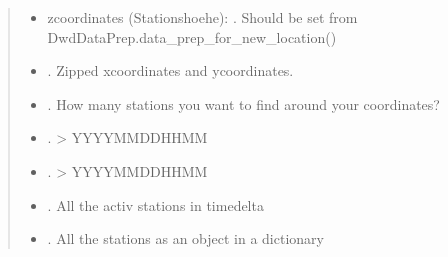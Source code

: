 \documentclass[letterpaper,10pt,english]{sphinxmanual}
\begin{document}
\begin{fulllineitems}
\begin{fulllineitems}
\begin{quote}
\begin{description}
\begin{itemize}
\item {} 
\sphinxAtStartPar
{} \textendash{} z\sphinxhyphen{}coordinates (Stationshoehe): . Should be set from DwdDataPrep.data\_prep\_for\_new\_location()

\item {} 
\sphinxAtStartPar
{} \textendash{} . Zipped x\sphinxhyphen{}coordinates and y\sphinxhyphen{}coordinates.

\item {} 
\sphinxAtStartPar
{} \textendash{} . How many stations you want to find around your coordinates?

\item {} 
\sphinxAtStartPar
{} \textendash{} . \textendash{}\textgreater{} YYYYMMDDHHMM

\item {} 
\sphinxAtStartPar
{} \textendash{} . \textendash{}\textgreater{} YYYYMMDDHHMM

\item {} 
\sphinxAtStartPar
{} \textendash{} . All the activ stations in timedelta

\item {} 
\sphinxAtStartPar
{} \textendash{} . All the stations as an object in a dictionary

\end{itemize}

\end{description}\end{quote}

\end{fulllineitems}



\end{fulllineitems}
\end{document}
